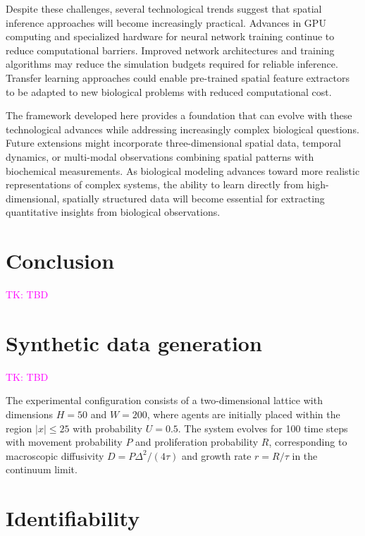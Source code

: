 \documentclass{article}
\begin{document}
Despite these challenges, several technological trends suggest that spatial inference approaches will become increasingly practical. Advances in GPU computing and specialized hardware for neural network training continue to reduce computational barriers. Improved network architectures and training algorithms may reduce the simulation budgets required for reliable inference. Transfer learning approaches could enable pre-trained spatial feature extractors to be adapted to new biological problems with reduced computational cost.

The framework developed here provides a foundation that can evolve with these technological advances while addressing increasingly complex biological questions. Future extensions might incorporate three-dimensional spatial data, temporal dynamics, or multi-modal observations combining spatial patterns with biochemical measurements. As biological modeling advances toward more realistic representations of complex systems, the ability to learn directly from high-dimensional, spatially structured data will become essential for extracting quantitative insights from biological observations.


\section{Conclusion}

\textcolor{magenta}{TK: TBD}

\appendix






\newpage
\section{Synthetic data generation}\label{sec: synthetic_data_generation}

\textcolor{magenta}{TK: TBD}

The experimental configuration consists of a two-dimensional lattice with dimensions $H = 50$ and $W = 200$, where agents are initially placed within the region $|x| \leq 25$ with probability $U = 0.5$. The system evolves for 100 time steps with movement probability $P$ and proliferation probability $R$, corresponding to macroscopic diffusivity $D = P\Delta^2/(4\tau)$ and growth rate $r = R/\tau$ in the continuum limit.



\section{Identifiability}\label{ap:identifiability}
\end{document}
